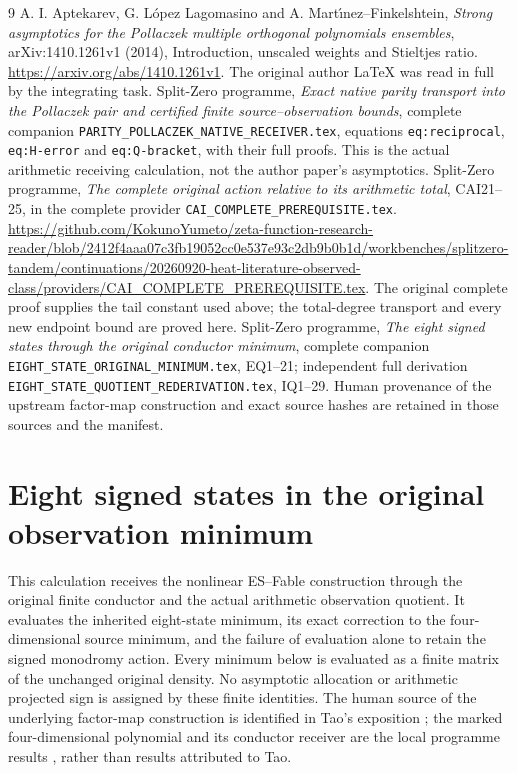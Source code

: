 \documentclass[11pt]{article}
\begin{document}
\begin{thebibliography}{9}
 A. I. Aptekarev, G. L\'opez Lagomasino and
A. Mart\'{\i}nez--Finkelshtein, \emph{Strong asymptotics for the
Pollaczek multiple orthogonal polynomials ensembles},
arXiv:1410.1261v1 (2014), Introduction, unscaled weights and
Stieltjes ratio. \url{https://arxiv.org/abs/1410.1261v1}.
The original author LaTeX was read in full by the integrating task.
 Split-Zero programme, \emph{Exact native parity transport
into the Pollaczek pair and certified finite source--observation bounds},
complete companion \texttt{PARITY\_POLLACZEK\_NATIVE\_RECEIVER.tex},
equations \texttt{eq:reciprocal}, \texttt{eq:H-error} and
\texttt{eq:Q-bracket}, with their full proofs. This is the actual
arithmetic receiving calculation, not the author paper's asymptotics.
 Split-Zero programme, \emph{The complete original action
relative to its arithmetic total}, CAI21--25, in the complete provider
\texttt{CAI\_COMPLETE\_PREREQUISITE.tex}.
\url{https://github.com/KokunoYumeto/zeta-function-research-reader/blob/2412f4aaa07c3fb19052cc0e537e93c2db9b0b1d/workbenches/splitzero-tandem/continuations/20260920-heat-literature-observed-class/providers/CAI_COMPLETE_PREREQUISITE.tex}.
The original complete proof supplies the tail constant used above;
the total-degree transport and every new endpoint bound are proved here.
 Split-Zero programme, \emph{The eight signed states
through the original conductor minimum}, complete companion
\texttt{EIGHT\_STATE\_ORIGINAL\_MINIMUM.tex}, EQ1--21; independent
full derivation \texttt{EIGHT\_STATE\_QUOTIENT\_REDERIVATION.tex},
IQ1--29. Human provenance of the upstream factor-map construction
and exact source hashes are retained in those sources and the manifest.
\end{thebibliography}

\endgroup

\clearpage\begingroup
\part*{Eight signed states in the original observation minimum}
\newcommand{\eightminC}{\mathbb C}
\newcommand{\eightminPp}{\mathcal P}
\newcommand{\eightminim}{\operatorname{im}}
\newcommand{\eightminrank}{\operatorname{rank}}
\newcommand{\eightmindiag}{\operatorname{diag}}



This calculation receives the nonlinear ES--Fable construction through
the original finite conductor and the actual arithmetic observation
quotient. It evaluates the inherited eight-state minimum, its exact
correction to the four-dimensional source minimum, and the failure of
evaluation alone to retain the signed monodromy action. Every minimum
below is evaluated as a finite matrix of the unchanged original density.
No asymptotic allocation or arithmetic projected sign is assigned by
these finite identities. The human source of the underlying factor-map
construction is identified in Tao's exposition \cite{eightmin:Tao}; the marked
four-dimensional polynomial and its conductor receiver are the local
programme results \cite{eightmin:FC}, rather than results attributed to Tao.
\end{document}
